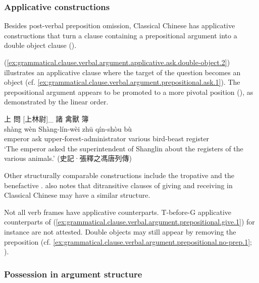\documentclass[UTF8, a4paper, oneside, scheme=plain, 12pt]{ctexrep}
\newcommand*{\citechap}[1]{Ch.~{#1}}
\newcommand*{\citepage}[1]{p.~{#1}}
\newcommand*{\citepages}[1]{pp.~{#1}}
\newcommand{\translate}[1]{`#1'}
\begin{document}
\subsubsection{Applicative constructions}\label{sec:grammatical.clause.verbal.argument.applicative}

Besides post-verbal preposition omission,
Classical Chinese has applicative constructions that
turn a clause containing a prepositional argument into a double object clause  
(\citealt[\citechap{10}]{meiguang2018}).

(\ref{ex:grammatical.clause.verbal.argument.applicative.ask.double-object.2}) illustrates an applicative clause where the target of the question becomes an object
(cf. \ref{ex:grammatical.clause.verbal.argument.prepositional.ask.1}).
The prepositional argument appears to be promoted to a more pivotal position
(),
as demonstrated by the linear order.


\begin{exe}
    \ex\label{ex:grammatical.clause.verbal.argument.applicative.ask.double-object.2}
    \glll
    上 問 [上林尉]_{} 諸 禽獸 簿 \\
    shàng wèn Shàng-lín-wèi zhū qín-shòu bù \\
    emperor ask upper-forest-administrator various bird-beast register \\
    \glt\translate{The emperor asked the superintendent of Shanglin about the registers of the various animals.} \hfill (史記·張釋之馮唐列傳)
\end{exe}

Other structurally comparable constructions include the tropative and the benefactive 
\citep[\citepages{389-415}]{meiguang2018}.
\citet[\citepage{420-421}]{meiguang2018} also notes that ditransitive clauses of giving and receiving in Classical Chinese may have a similar structure. 

Not all verb frames have applicative counterparts.
T-before-G applicative counterparts of (\ref{ex:grammatical.clause.verbal.argument.prepositional.give.1}) for instance are not attested.
Double objects may still appear by removing the preposition (cf. \ref{ex:grammatical.clause.verbal.argument.prepositional.no-prep.1}; ).

\subsubsection{Possession in argument structure}\label{sec:grammatical.clause.verbal.argument.possession}
\end{document}
